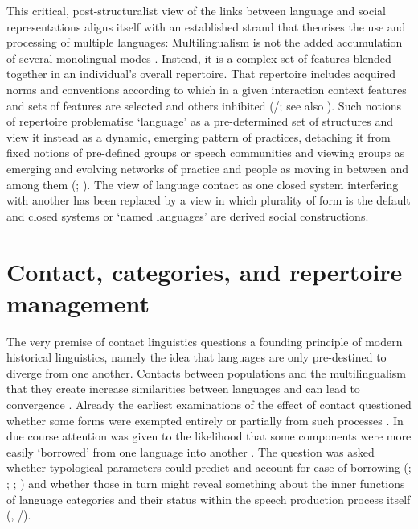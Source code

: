 \documentclass[output=paper]{langscibook}
\begin{document}
This critical, post-structuralist view of the links between language and social representations aligns itself with an established strand that theorises the use and processing of multiple languages: Multilingualism is not the added accumulation of several monolingual modes \citep{grosjean_neurolinguists_1989}. Instead, it is a complex set of features \citep{jorgensen_polylingual_2008} blended together in an individual’s overall repertoire. That repertoire includes acquired norms and conventions according to which in a given interaction context features and sets of features are selected and others inhibited (\citealt{matras_language_2009}/\citeyear{matras_language_2020}; see also \citealt{green_mental_1998}). Such notions of repertoire problematise ‘language’ as a pre-determined set of structures and view it instead as a dynamic, emerging pattern of practices, detaching it from fixed notions of pre-defined groups or speech communities and viewing groups as emerging and evolving networks of practice and people as moving in between and among them (\citealt{busch_linguistic_2012}; \citealt{blommaert_superdiverse_2013}). The view of language contact as one closed system interfering with another has been replaced by a view in which plurality of form is the default and closed systems or ‘named languages’ are derived social constructions.

\section{Contact, categories, and repertoire management}
The very premise of contact linguistics questions a founding principle of modern historical linguistics, namely the idea that languages are only pre-destined to diverge from one another. Contacts between populations and the multilingualism that they create increase similarities between languages and can lead to convergence \citep{trubetzkoy_proposition_1928}. Already the earliest examinations of the effect of contact questioned whether some forms were exempted entirely or partially from such processes \citep{whitney_mixture_1881}. In due course attention was given to the likelihood that some components were more easily ‘borrowed’ from one language into another \citep{thomason_language_1988}. The question was asked whether typological parameters could predict and account for ease of borrowing (\citealt{moravcsik_universals_1978}; \citealt{campbell_proposed_1993}; \citealt{stolz_universelle_1997}; \citealt{matras_borrowability_2007}) and whether those in turn might reveal something about the inner functions of language categories and their status within the speech production process itself (\citealt{myers-scotton_four_2000}, \citealt{matras_language_2009}/\citeyear{matras_language_2020}). 
\end{document}
